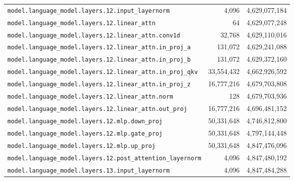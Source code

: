 \documentclass[10pt,a4paper]{article}
\theoremstyle{definition}
\begin{document}
\begin{appendices}
\begin{longtable}{p{9.5cm}rr}
\texttt{model.\allowbreak{}language\_model.\allowbreak{}layers.\allowbreak{}12.\allowbreak{}input\_layernorm} & 4,096 & 4,629,077,184 \\
\texttt{model.\allowbreak{}language\_model.\allowbreak{}layers.\allowbreak{}12.\allowbreak{}linear\_attn} & 64 & 4,629,077,248 \\
\texttt{model.\allowbreak{}language\_model.\allowbreak{}layers.\allowbreak{}12.\allowbreak{}linear\_attn.\allowbreak{}conv1d} & 32,768 & 4,629,110,016 \\
\texttt{model.\allowbreak{}language\_model.\allowbreak{}layers.\allowbreak{}12.\allowbreak{}linear\_attn.\allowbreak{}in\_proj\_a} & 131,072 & 4,629,241,088 \\
\texttt{model.\allowbreak{}language\_model.\allowbreak{}layers.\allowbreak{}12.\allowbreak{}linear\_attn.\allowbreak{}in\_proj\_b} & 131,072 & 4,629,372,160 \\
\texttt{model.\allowbreak{}language\_model.\allowbreak{}layers.\allowbreak{}12.\allowbreak{}linear\_attn.\allowbreak{}in\_proj\_qkv} & 33,554,432 & 4,662,926,592 \\
\texttt{model.\allowbreak{}language\_model.\allowbreak{}layers.\allowbreak{}12.\allowbreak{}linear\_attn.\allowbreak{}in\_proj\_z} & 16,777,216 & 4,679,703,808 \\
\texttt{model.\allowbreak{}language\_model.\allowbreak{}layers.\allowbreak{}12.\allowbreak{}linear\_attn.\allowbreak{}norm} & 128 & 4,679,703,936 \\
\texttt{model.\allowbreak{}language\_model.\allowbreak{}layers.\allowbreak{}12.\allowbreak{}linear\_attn.\allowbreak{}out\_proj} & 16,777,216 & 4,696,481,152 \\
\texttt{model.\allowbreak{}language\_model.\allowbreak{}layers.\allowbreak{}12.\allowbreak{}mlp.\allowbreak{}down\_proj} & 50,331,648 & 4,746,812,800 \\
\texttt{model.\allowbreak{}language\_model.\allowbreak{}layers.\allowbreak{}12.\allowbreak{}mlp.\allowbreak{}gate\_proj} & 50,331,648 & 4,797,144,448 \\
\texttt{model.\allowbreak{}language\_model.\allowbreak{}layers.\allowbreak{}12.\allowbreak{}mlp.\allowbreak{}up\_proj} & 50,331,648 & 4,847,476,096 \\
\texttt{model.\allowbreak{}language\_model.\allowbreak{}layers.\allowbreak{}12.\allowbreak{}post\_attention\_layernorm} & 4,096 & 4,847,480,192 \\
\texttt{model.\allowbreak{}language\_model.\allowbreak{}layers.\allowbreak{}13.\allowbreak{}input\_layernorm} & 4,096 & 4,847,484,288 \\

\end{longtable}
\end{appendices}
\end{document}
